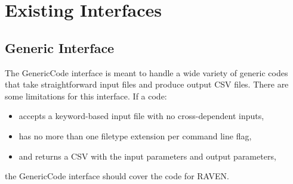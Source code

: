 \section{Existing Interfaces}
\label{sec:existingInterface}
\subsection{Generic Interface}
\label{subsec:genericInterface}
The GenericCode interface is meant to handle a wide variety of generic codes
that take straightforward input files and produce output CSV files.  There are
some limitations for this interface.
If a code: \vspace{-20pt}
\begin{itemize}
\item accepts a keyword-based input file with no cross-dependent inputs,
\item has no more than one filetype extension per command line flag,
\item and returns a CSV with the input parameters and output parameters,
\end{itemize}\vspace{-20pt}
the GenericCode interface should cover the code for RAVEN.

